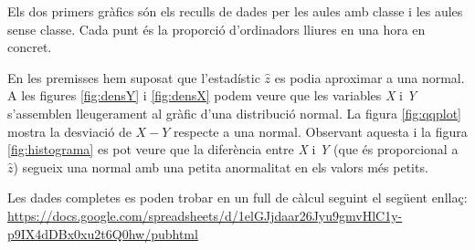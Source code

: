 Els dos primers gràfics són els reculls de dades per les aules amb classe i les aules sense classe. Cada punt és la proporció d'ordinadors lliures en una hora en concret.

En les premisses hem suposat que l'estadístic $\hat{z}$ es podia aproximar a una normal. A les figures \ref{fig:densY} i \ref{fig:densX} podem veure que les variables \emph{X} i \emph{Y} s'assemblen lleugerament al gràfic d'una distribució normal. La figura \ref{fig:qqplot} mostra la desviació de $X-Y$ respecte a una normal. Observant aquesta i la figura \ref{fig:histograma} es pot veure que la diferència entre \emph{X} i \emph{Y} (que és proporcional a $\hat{z}$) segueix una normal amb una petita anormalitat en els valors més petits.

Les dades completes es poden trobar en un full de càlcul seguint el següent enllaç:\\
\url{https://docs.google.com/spreadsheets/d/1elGJjdaar26Jyu9gmvHlC1y-p9IX4dDBx0xu2t6Q0hw/pubhtml}

